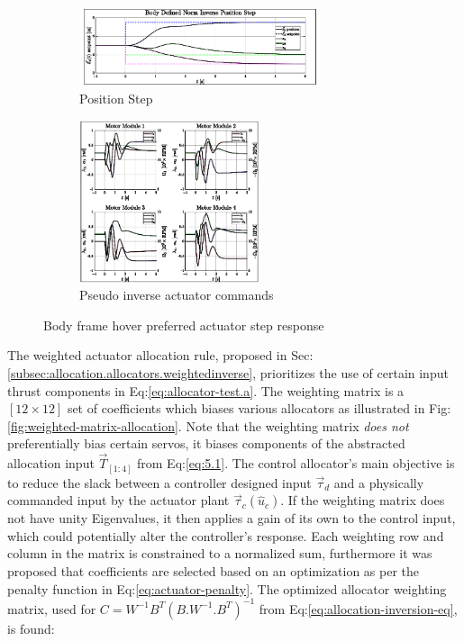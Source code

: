 \begin{figure}[htbp]
\ContinuedFloat
\begin{subfigure}{\textwidth}
\vspace{-3pt}
\centering
\includegraphics[width=0.78\textwidth]{graphs/body_norm_position}
\vspace{-4pt}
\caption{Position Step}
\label{fig:body_norm_position}
\end{subfigure}
\vspace{-8pt}
\begin{subfigure}{\textwidth}
\centering
\includegraphics[width=0.58\textwidth]{graphs/body_norm_input}
\vspace{-4pt}
\caption{Pseudo inverse actuator commands}
\label{fig:body_norm_input}
\end{subfigure}
\caption{Body frame hover preferred actuator step response}
\label{fig:body-norm-step}
\vspace{-10pt}
\end{figure}
\par
The weighted actuator allocation rule, proposed in Sec:\ref{subsec:allocation.allocators.weightedinverse}, prioritizes the use of certain input thrust components in Eq:\ref{eq:allocator-test.a}. The weighting matrix is a $[12\times 12]$ set of coefficients which biases various allocators as illustrated in Fig:\ref{fig:weighted-matrix-allocation}. Note that the weighting matrix \emph{does not} preferentially bias certain servos, it biases components of the abstracted allocation input $\vec{T}_{[1:4]}$ from Eq:\ref{eq:5.1}. The control allocator's main objective is to reduce the slack between a controller designed input $\vec{\tau}_d$ and a physically commanded input by the actuator plant $\vec{\tau}_c(\hat{u}_c)$. If the weighting matrix does not have unity Eigenvalues, it then applies a gain of its own to the control input, which could potentially alter the controller's response. Each weighting row and column in the matrix is constrained to a normalized sum, furthermore it was proposed that coefficients are selected based on an optimization as per the penalty function in Eq:\ref{eq:actuator-penalty}. The optimized allocator weighting matrix, used for $C=W^{-1}B^T(B.W^{-1}.B^T)^{-1}$ from Eq:\ref{eq:allocation-inversion-eq}, is found:
